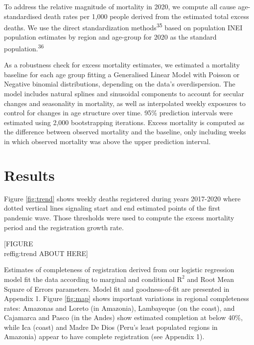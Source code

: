 \documentclass[
]{article}
\begin{document}
To address the relative magnitude of mortality in 2020, we compute all cause age-standardised death rates per 1,000 people derived from the estimated total excess deaths. We use the direct standardization methods\textsuperscript{35} based on population INEI population estimates by region and age-group for 2020 as the standard population.\textsuperscript{36}

As a robustness check for excess mortality estimates, we estimated a mortality baseline for each age group fitting a Generalised Linear Model with Poisson or Negative binomial distributions, depending on the data's overdispersion. The model includes natural splines and sinusoidal components to account for secular changes and seasonality in mortality, as well as interpolated weekly exposures to control for changes in age structure over time. 95\% prediction intervals were estimated using 2,000 bootstrapping iterations. Excess mortality is computed as the difference between observed mortality and the baseline, only including weeks in which observed mortality was above the upper prediction interval.

\hypertarget{results}{%
\section{Results}\label{results}}

Figure \ref{fig:trend} shows weekly deaths registered during years 2017-2020 where dotted vertical lines signaling start and end estimated points of the first pandemic wave. Those thresholds were used to compute the excess mortality period and the registration growth rate.

\begin{center}
[FIGURE \\ref{fig:trend} ABOUT HERE]
\end{center}

Estimates of completeness of registration derived from our logistic regression model fit the data according to marginal and conditional \(\text{R}^2\) and Root Mean Square of Errors parameters. Model fit and goodness-of-fit are presented in Appendix 1. Figure \ref{fig:map} shows important variations in regional completeness rates: Amazonas and Loreto (in Amazonia), Lambayeque (on the coast), and Cajamarca and Pasco (in the Andes) show estimated completion at below 40\%, while Ica (coast) and Madre De Dios (Peru's least populated regions in Amazonia) appear to have complete registration (see Appendix 1).
\end{document}
